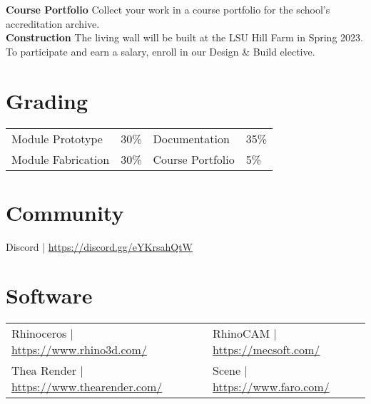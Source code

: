 \documentclass[11pt,article,oneside]{memoir}
\begin{document}
\noindent \textbf{Course Portfolio}
Collect your work in a course portfolio 
for the school's accreditation archive.
\\

\noindent \textbf{Construction}
The living wall will be built at the LSU Hill Farm in Spring 2023.
To participate and earn a salary, enroll in our Design \& Build elective.

\section{Grading}
\vspace*{-0.4cm}
\begin{table}[H]
\begin{tabular}{@{}l r @{\hskip 2cm} l @{\hskip 0.5cm} l}
Module Prototype & 30\% & Documentation & 35\% \\
Module Fabrication & 30\% & Course Portfolio & 5\% \\
\end{tabular}
\end{table}

\section{Community}
Discord | \url{https://discord.gg/eYKrsahQtW}

\section{Software}
\begin{table}[H]
\begin{tabular}{@{}l l}
Rhinoceros | \url{https://www.rhino3d.com/} &
RhinoCAM  | \url{https://mecsoft.com/}\\
Thea Render | \url{https://www.thearender.com/} &
Scene | \url{https://www.faro.com/} \\

\end{tabular}
\end{table}
\end{document}
